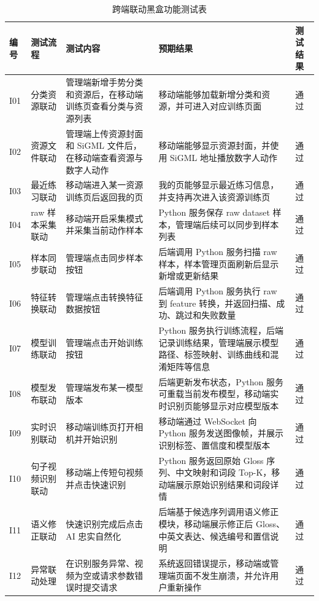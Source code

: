 \begin{longtable}{L{0.08\textwidth} L{0.20\textwidth} L{0.25\textwidth} L{0.29\textwidth} L{0.10\textwidth}}
  \caption{跨端联动黑盒功能测试表}
  \label{tab:chapter07-integration-black-box-test}\\
  \toprule
  编号 & 测试流程 & 测试内容 & 预期结果 & 测试结果 \\
  \midrule
  I01 & 分类资源联动 & 管理端新增手势分类和资源后，在移动端训练页查看分类与资源列表 & 移动端能够加载新增分类和资源，并可进入对应训练页面 & 通过 \\
  I02 & 资源文件联动 & 管理端上传资源封面和 SiGML 文件后，在移动端查看资源与数字人动作 & 移动端能够显示资源封面，并使用 SiGML 地址播放数字人动作 & 通过 \\
  I03 & 最近练习联动 & 移动端进入某一资源训练页后返回我的页 & 我的页能够显示最近练习信息，并支持再次进入该资源训练页 & 通过 \\
  I04 & raw 样本采集联动 & 移动端开启采集模式并采集当前动作样本 & Python 服务保存 raw dataset 样本，管理端后续可以同步到样本列表 & 通过 \\
  I05 & 样本同步联动 & 管理端点击同步样本按钮 & 后端调用 Python 服务扫描 raw 样本，样本管理页面刷新后显示新增或更新结果 & 通过 \\
  I06 & 特征转换联动 & 管理端点击转换特征数据按钮 & 后端调用 Python 服务执行 raw 到 feature 转换，并返回扫描、成功、跳过和失败数量 & 通过 \\
  I07 & 模型训练联动 & 管理端点击开始训练按钮 & Python 服务执行训练流程，后端记录训练结果，管理端展示模型路径、标签映射、训练曲线和混淆矩阵等信息 & 通过 \\
  I08 & 模型发布联动 & 管理端发布某一模型版本 & 后端更新发布状态，Python 服务可重载当前发布模型，移动端实时识别页能够显示对应模型版本 & 通过 \\
  I09 & 实时识别联动 & 移动端训练页打开相机并开始识别 & 移动端通过 WebSocket 向 Python 服务发送图像帧，并展示识别标签、置信度和模型版本 & 通过 \\
  I10 & 句子视频识别联动 & 移动端上传短句视频并点击快速识别 & Python 服务返回原始 Gloss 序列、中文映射和词段 Top-K，移动端展示原始识别结果和词段详情 & 通过 \\
  I11 & 语义修正联动 & 快速识别完成后点击 AI 忠实自然化 & 后端基于候选序列调用语义修正模块，移动端展示修正后 Gloss、中英文表达、候选编号和置信说明 & 通过 \\
  I12 & 异常联动处理 & 在识别服务异常、视频为空或请求参数错误时提交请求 & 系统返回错误提示，移动端或管理端页面不发生崩溃，并允许用户重新操作 & 通过 \\
  \bottomrule
\end{longtable}

